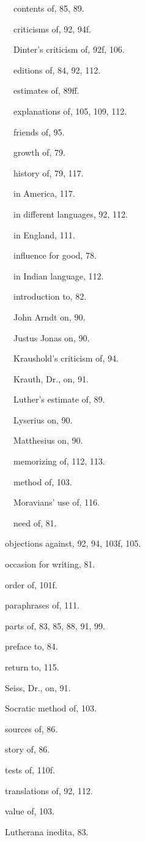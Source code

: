 \begin{originalinhalt}
 contents of, 85, 89.

 criticisms of, 92, 94f.

 Dinter’s criticism of, 92f, 106.

 editions of, 84, 92, 112.

 estimates of, 89ff.

 explanations of, 105, 109, 112.

 friends of, 95.

 growth of, 79.

 history of, 79, 117.

 in America, 117.

 in different languages, 92, 112.

 in England, 111.

 influence for good, 78.

 in Indian language, 112.

 introduction to, 82.

 John Arndt on, 90.

 Justus Jonas on, 90.

 Kraushold’s criticism of, 94.

 Krauth, Dr., on, 91.

 Luther’s estimate of, 89.

 Lyserius on, 90.

 Matthesius on, 90.

 memorizing of, 112, 113.

 method of, 103.

 Moravians’ use of, 116.

 need of, 81.

objections against, 92, 94, 103f, 105.

occasion for writing, 81.

order of, 101f.

paraphrases of, 111.

parts of, 83, 85, 88, 91, 99.

preface to, 84.

return to, 115.

Seiss, Dr., on, 91.

Socratic method of, 103.

sources of, 86.

story of, 86.

tests of, 110f.

translations of, 92, 112.

value of, 103.

Lutherana inedita, 83.


\end{originalinhalt}

